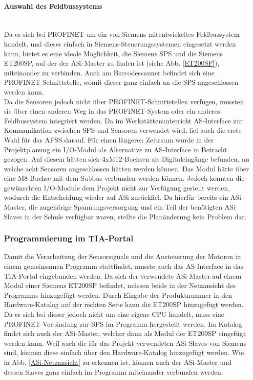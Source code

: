 \paragraph{Auswahl des Feldbussystems}\mbox{}\\
Da es sich bei PROFINET um ein von Siemens mitentwickeltes Feldbussystem handelt, und dieses einfach in Siemens-Steuerungssystemen eingesetzt werden kann, bietet es eine ideale Möglichkeit, die Siemens SPS und die Siemens ET200SP, auf der der ASi-Master zu finden ist (siehe Abb. \ref{ET200SP}), miteinander zu verbinden. Auch am Barcodescanner befindet sich eine PROFINET-Schnittstelle, womit dieser ganz einfach an die SPS angeschlossen werden kann.\\
Da die Sensoren jedoch nicht über PROFINET-Schnittstellen verfügen, mussten sie über einen anderen Weg in das PROFINET-System oder ein anderes Feldbussystem integriert werden. Da im Werkstättenunterricht AS-Interface zur Kommunikation zwischen SPS und Sensoren verwendet wird, fiel auch die erste Wahl für das AFSS darauf. Für einen längeren Zeitraum wurde in der Projektplanung ein I/O-Modul als Alternative zu AS-Interface in Betracht gezogen. Auf diesem hätten sich 4xM12-Buchsen als Digitaleingänge befunden, an welche acht Sensoren angeschlossen hätten werden können. Das Modul hätte über eine M8-Buchse mit dem Subbus verbunden werden können. Jedoch konnten die gewünschten I/O-Module dem Projekt nicht zur Verfügung gestellt werden, wodurch die Entscheidung wieder auf ASi zurückfiel. Da hierfür bereits ein ASi-Master, die zugehörige Spannungsversorgung und ein Teil der benötigten ASi-Slaves in der Schule verfügbar waren, stellte die Planänderung kein Problem dar.

\subsubsection{Programmierung im TIA-Portal}
Damit die Verarbeitung der Sensorsignale und die Ansteuerung der Motoren in einem gemeinsamen Programm stattfindet, musste auch das AS-Interface in das TIA-Portal eingebunden werden. Da sich der verwendete ASi-Master auf einem Modul einer Siemens ET200SP befindet, müssen beide in der Netzansicht des Programms hinzugefügt werden. Durch Eingabe der Produktnummer in den Hardware-Katalog auf der rechten Seite kann die ET200SP hinzugefügt werden. Da es sich bei dieser jedoch nicht um eine eigene CPU handelt, muss eine PROFINET-Verbindung zur SPS im Programm hergestellt werden. Im Katalog findet sich auch der ASi-Master, welcher dann als Modul der ET200SP eingefügt werden kann. Weil auch die für das Projekt verwendeten ASi-Slaves von Siemens sind, können diese einfach über den Hardware-Katalog hinzugefügt werden. Wie in Abb. \ref{ASi-Netzansicht} zu erkennen ist, können auch der ASi-Master und dessen Slaves ganz einfach im Programm miteinander verbunden werden.


